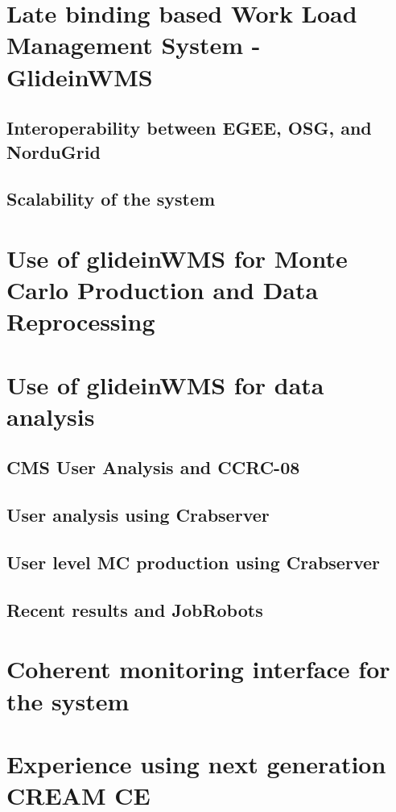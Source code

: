 \documentclass[a4paper]{jpconf}
\begin{document}
\section{Late binding based Work Load Management System - GlideinWMS }



\subsection {Interoperability between EGEE, OSG, and NorduGrid}



\subsection {Scalability of the system}



\section{Use of glideinWMS for Monte Carlo Production and Data Reprocessing }



\section{Use of glideinWMS for data analysis}



\subsection{CMS User Analysis and CCRC-08}



\subsection{User analysis using Crabserver}



\subsection{User level MC production using Crabserver}



\subsection{Recent results and JobRobots}



\section{Coherent monitoring interface for the system}



\section{Experience using next generation CREAM CE}
\end{document}
